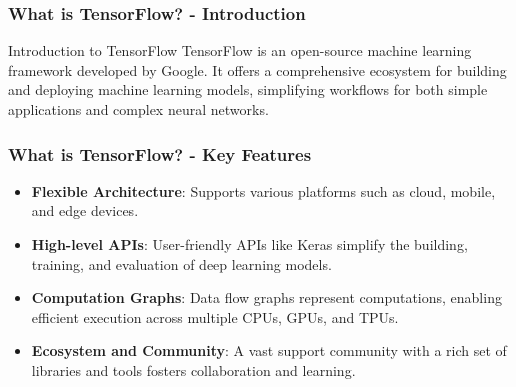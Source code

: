 \documentclass[aspectratio=169]{beamer}
\begin{document}
\begin{frame}[fragile]
    \frametitle{What is TensorFlow? - Introduction}
    \begin{block}{Introduction to TensorFlow}
        TensorFlow is an open-source machine learning framework developed by Google. It offers a comprehensive ecosystem for building and deploying machine learning models, simplifying workflows for both simple applications and complex neural networks.
    \end{block}
\end{frame}

\begin{frame}[fragile]
    \frametitle{What is TensorFlow? - Key Features}
    \begin{itemize}
        \item \textbf{Flexible Architecture}: Supports various platforms such as cloud, mobile, and edge devices.
        \item \textbf{High-level APIs}: User-friendly APIs like Keras simplify the building, training, and evaluation of deep learning models.
        \item \textbf{Computation Graphs}: Data flow graphs represent computations, enabling efficient execution across multiple CPUs, GPUs, and TPUs.
        \item \textbf{Ecosystem and Community}: A vast support community with a rich set of libraries and tools fosters collaboration and learning.
    \end{itemize}
\end{frame}
\end{document}
